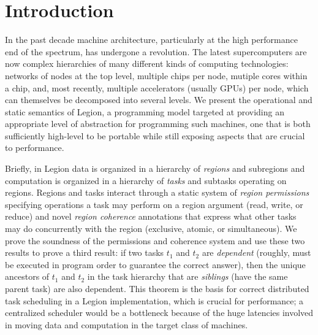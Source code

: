 
\section{Introduction}
\label{sec:intro}

In the past decade machine architecture, particularly at the high
performance end of the spectrum, has undergone a revolution.  The
latest supercomputers are now complex hierarchies of many different
kinds of computing technologies: networks of nodes at the top level,
multiple chips per node, mutiple cores within a chip, and, most
recently, multiple accelerators (usually GPUs) per node, which 
can themselves be decomposed into several levels.   We present the operational and static
semantics of Legion, a programming model targeted at providing an
appropriate level of abstraction for programming such machines, one
that is both sufficiently high-level to be portable while still
exposing aspects that are crucial to performance. 

Briefly, in Legion data is organized in a hierarchy of {\em regions}
and subregions and computation is organized in a hierarchy of {\em
tasks} and subtasks operating on regions.  Regions and tasks interact
through a static system of {\em region permissions} specifying 
operations a task may perform on a region argument (read,
write, or reduce) and novel {\em region coherence} annotations that
express what other tasks may do concurrently with
the region (exclusive, atomic, or simultaneous).  We prove the
soundness of the permissions and coherence system and use these two
results to prove a third result: if two tasks $t_1$ and $t_2$ are {\em
dependent} (roughly, must be executed in program order to guarantee
the correct answer), then the unique ancestors of $t_1$ and $t_2$ in
the task hierarchy that are {\em siblings} (have the same parent task)
are also dependent.  This theorem is the basis for correct distributed
task scheduling in a Legion implementation, which is crucial for
performance; a centralized scheduler would be a bottleneck
because of the huge latencies involved in moving data and computation
in the target class of machines.

